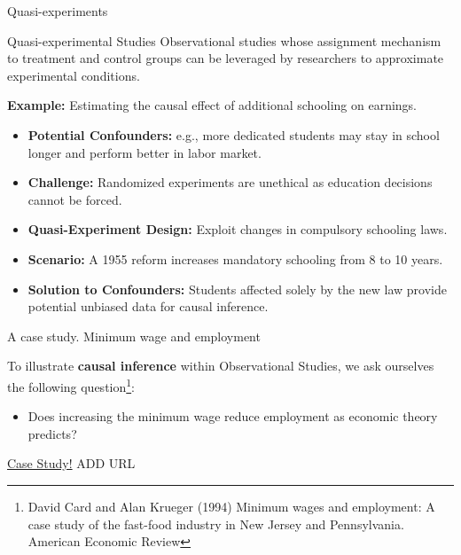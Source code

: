 \documentclass[aspectratio=169]{beamer}
\begin{document}
\begin{frame}{Quasi-experiments}

    \begin{coolblock}{Quasi-experimental Studies}
        Observational studies whose assignment mechanism to treatment and control groups can be leveraged by researchers to approximate experimental conditions.
    \end{coolblock}
    \vspace{0.3cm}

    \textbf{Example:} Estimating the causal effect of additional schooling on earnings.
\begin{itemize}
    \item \textbf{Potential Confounders:} e.g., more dedicated students may stay in school longer and perform better in labor market. 
    \item \textbf{Challenge:} Randomized experiments are unethical as education decisions cannot be forced.
    \item \textbf{Quasi-Experiment Design:} Exploit changes in compulsory schooling laws.
    \item \textbf{Scenario:} A 1955 reform increases mandatory schooling from 8 to 10 years.
    \item \textbf{Solution to Confounders:} Students affected solely by the new law provide potential unbiased data for causal inference.
\end{itemize}
    
\end{frame}

\begin{frame}{A case study. Minimum wage and employment}

To illustrate \textbf{causal inference} within Observational Studies, we ask ourselves the following question\footnote{\scriptsize David Card and Alan Krueger (1994) Minimum wages and employment: A case
study of the fast-food industry in New Jersey and Pennsylvania. American Economic Review}:
\vspace{0.2cm}

\begin{itemize}
    \item Does increasing the minimum wage reduce employment as economic theory predicts?
\end{itemize}
\vspace{0.8cm}

\begin{center}
    \Large  \href{url}{Case Study!} ADD URL
\end{center}

\end{frame}
\end{document}
